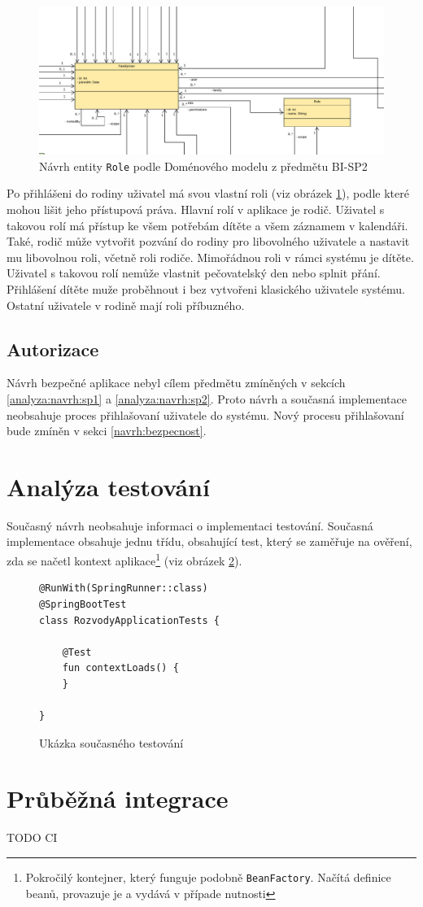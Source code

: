         \begin{figure}\centering
	        \includegraphics[width=!ю)\textwidth]{pdfs/Role1}
	        \caption[Návrh \texttt{Role}]{Návrh entity \texttt{Role} podle Doménového modelu z předmětu BI-SP2}\label{image:Role1}
        \end{figure}
        Po přihlášeni do rodiny uživatel má svou vlastní roli (viz obrázek \ref{image:Role1}), podle které mohou lišit jeho přístupová práva. Hlavní rolí v aplikace je rodič. Uživatel s takovou rolí má přístup ke všem potřebám dítěte a všem záznamem v kalendáři. Také, rodič může vytvořit pozvání do rodiny pro libovolného uživatele a nastavit mu libovolnou roli, včetně roli rodiče. Mimořádnou roli v rámci systému je dítěte. Uživatel s takovou rolí nemůže vlastnit pečovatelský den nebo splnit přání. Přihlášení dítěte muže proběhnout i bez vytvořeni klasického uživatele systému. Ostatní uživatele v rodině mají roli příbuzného.
    
    \subsection{Autorizace}
        Návrh bezpečné aplikace nebyl cílem předmětu zmíněných v sekcích \ref{analyza:navrh:sp1} a \ref{analyza:navrh:sp2}. Proto návrh a současná implementace neobsahuje proces přihlašovaní uživatele do systému. Nový procesu přihlašovaní bude zmíněn v sekci \ref{navrh:bezpecnost}.
        
\section{Analýza testování}\label{analyza:testovani}
    Současný návrh neobsahuje informaci o implementaci testování. Současná implementace obsahuje jednu třídu, obsahující test, který se zaměřuje na ověření, zda se načetl {kontext aplikace}\footnote{Pokročilý kontejner, který funguje podobně \texttt{BeanFactory}. Načítá definice beanů, provazuje je a vydává v případe nutnosti} (viz obrázek \ref{code:test-context-loads1}).
    \begin{figure}
    \begin{verbatim}
@RunWith(SpringRunner::class)
@SpringBootTest
class RozvodyApplicationTests {

    @Test
    fun contextLoads() {
    }

}
        \end{verbatim}
        \caption{Ukázka současného testování} 
        \label{code:test-context-loads1}
        \end{figure}
\section{Průběžná integrace}
    TODO CI
   